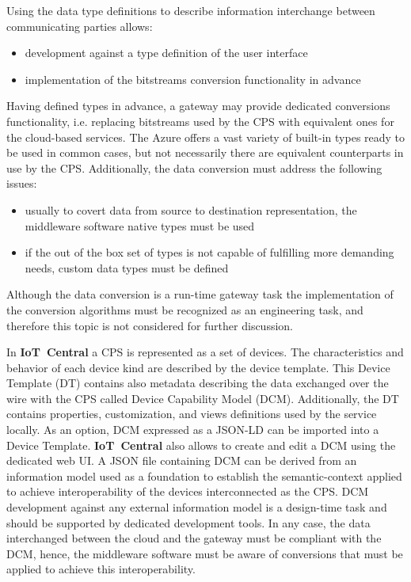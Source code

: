 \documentclass[runningheads]{llncs}
\begin{document}
Using the data type definitions to describe information interchange between communicating parties allows:

\begin{itemize}
      \item development against a type definition of the user interface
      \item implementation of the  bitstreams conversion functionality in advance
\end{itemize}

Having defined types in advance, a gateway may provide dedicated conversions functionality, i.e. replacing bitstreams used by the CPS with equivalent ones for the cloud-based services. The Azure offers a vast variety of built-in types ready to be used in common cases, but not necessarily there are equivalent counterparts in use by the CPS. Additionally, the data conversion must address the following issues:

\begin{itemize}
      \item usually to covert data from source to destination representation, the middleware software native types must be used
      \item if the out of the box set of types is not capable of fulfilling more demanding needs, custom data types must be defined
\end{itemize}

Although the data conversion is a run-time gateway task the implementation of the conversion algorithms must be recognized as an engineering task, and therefore this topic is not considered for further discussion.

In \textbf{IoT\ Central} a CPS is represented as a set of devices. The characteristics and behavior of each device kind are described by the device template. This Device Template (DT) contains also metadata describing the data exchanged over the wire with the CPS called Device Capability Model (DCM). Additionally, the DT contains properties, customization, and views definitions used by the service locally. As an option, DCM expressed as a JSON-LD can be imported into a Device Template. \textbf{IoT\ Central} also allows to create and edit a DCM using the dedicated web UI. A JSON file containing DCM can be derived from an information model used as a foundation to establish the semantic-context applied to achieve interoperability of the devices interconnected as the CPS. DCM development against any external information model is a design-time task and should be supported by dedicated development tools. In any case, the data interchanged between the cloud and the gateway must be compliant with the DCM, hence, the middleware software must be aware of conversions that must be applied to achieve this interoperability.
\end{document}
